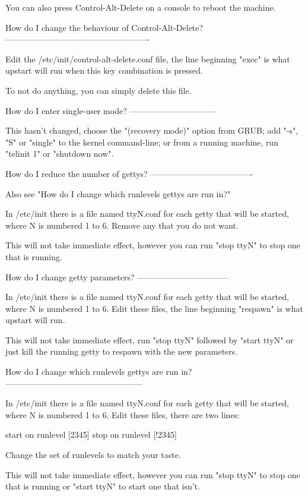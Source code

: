 \documentclass[mingoth,a4paper]{jsarticle}
\begin{document}
{{{{{{{You can also press Control-Alt-Delete on a console to reboot the
machine.


How do I change the behaviour of Control-Alt-Delete?
----------------------------------------------------

Edit the /etc/init/control-alt-delete.conf file, the line beginning
"exec" is what upstart will run when this key combination is pressed.

To not do anything, you can simply delete this file.


How do I enter single-user mode?
--------------------------------

This hasn't changed, choose the "(recovery mode)" option from GRUB;
add "-s", "S" or "single" to the kernel command-line; or from a
running machine, run "telinit 1" or "shutdown now".


How do I reduce the number of gettys?
-------------------------------------

Also see "How do I change which runlevels gettys are run in?"

In /etc/init there is a file named ttyN.conf for each getty that will be
started, where N is numbered 1 to 6.  Remove any that you do not
want.

This will not take immediate effect, however you can run "stop ttyN"
to stop one that is running.


How do I change getty parameters?
---------------------------------

In /etc/init there is a file named ttyN.conf for each getty that will be
started, where N is numbered 1 to 6.  Edit these files, the line
beginning "respawn" is what upstart will run.

This will not take immediate effect, run "stop ttyN" followed by
"start ttyN" or just kill the running getty to respawn with the new
parameters.


How do I change which runlevels gettys are run in?
--------------------------------------------------

In /etc/init there is a file named ttyN.conf for each getty that will be
started, where N is numbered 1 to 6.  Edit these files, there are two
lines:

   start on runlevel [2345]
   stop on runlevel [!2345]

Change the set of runlevels to match your taste.

This will not take immediate effect, however you can run "stop ttyN"
to stop one that is running or "start ttyN" to start one that isn't.


}}}}}}}
\end{document}
